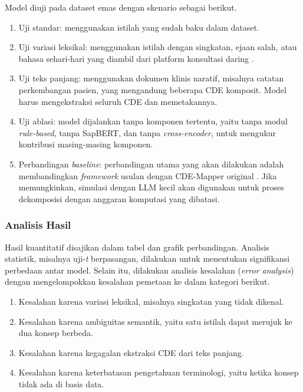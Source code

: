 Model diuji pada dataset emas dengan skenario sebagai berikut.

\begin{enumerate}
    \item Uji standar: menggunakan istilah yang sudah baku dalam dataset.
    \item Uji variasi leksikal: menggunakan istilah dengan singkatan, ejaan salah, atau bahasa sehari-hari yang diambil dari platform konsultasi daring \citep{purwitasari_comparison_2023}.
    \item Uji teks panjang: menggunakan dokumen klinis naratif, misalnya catatan perkembangan pasien, yang mengandung beberapa CDE komposit. Model harus mengekstraksi seluruh CDE dan memetakannya.
    \item Uji ablasi: model dijalankan tanpa komponen tertentu, yaitu tanpa modul \textit{rule-based}, tanpa SapBERT, dan tanpa \textit{cross-encoder}, untuk mengukur kontribusi masing-masing komponen.
    \item Perbandingan \textit{baseline}: perbandingan utama yang akan dilakukan adalah membandingkan \textit{framework} usulan dengan CDE-Mapper original \citep{gilani_cde-mapper_2025}. Jika memungkinkan, simulasi dengan LLM kecil akan digunakan untuk proses dekomposisi dengan anggaran komputasi yang dibatasi.
\end{enumerate}

\subsubsection{Analisis Hasil}

Hasil kuantitatif disajikan dalam tabel dan grafik perbandingan. Analisis statistik, misalnya uji-\textit{t} berpasangan, dilakukan untuk menentukan signifikansi perbedaan antar model. Selain itu, dilakukan analisis kesalahan (\textit{error analysis}) dengan mengelompokkan kesalahan pemetaan ke dalam kategori berikut.

\begin{enumerate}
    \item Kesalahan karena variasi leksikal, misalnya singkatan yang tidak dikenal.
    \item Kesalahan karena ambiguitas semantik, yaitu satu istilah dapat merujuk ke dua konsep berbeda.
    \item Kesalahan karena kegagalan ekstraksi CDE dari teks panjang.
    \item Kesalahan karena keterbatasan pengetahuan terminologi, yaitu ketika konsep tidak ada di basis data.
\end{enumerate}


